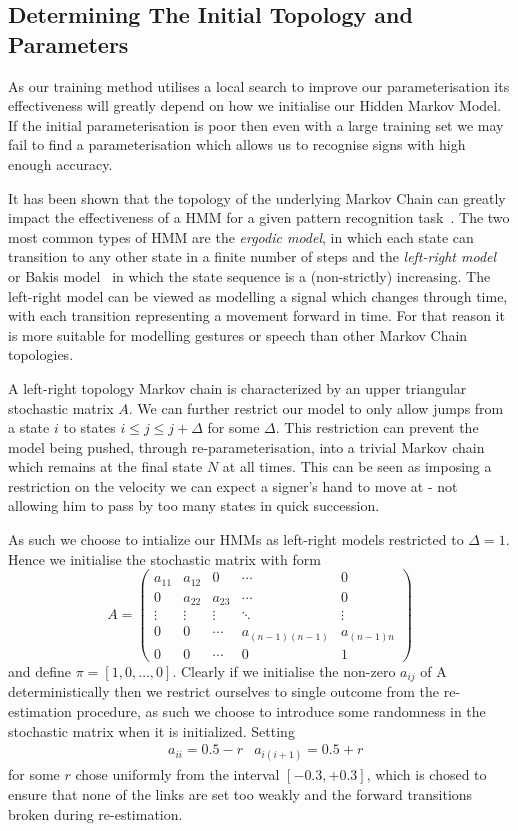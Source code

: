 \subsection{Determining The Initial Topology and Parameters}
As our training method utilises a local search to improve our parameterisation its effectiveness will greatly depend on how we initialise our Hidden Markov Model. If the initial parameterisation is poor then even with a large training set we may fail to find a parameterisation which allows us to  recognise signs with high enough accuracy.

It has been shown that the topology of the underlying Markov Chain can greatly impact the effectiveness of a HMM for a given pattern recognition task~\citep{rabiner1989tutorial, jelinek1998statistical}. The two most common types of HMM are the \emph{ergodic model}, in which each state can transition to any other state in a finite number of steps and the \emph{left-right model} or Bakis model~\citep{bakis1976continuous} in which the state sequence is a (non-strictly) increasing. The left-right model can be viewed as modelling a signal which changes through time, with each transition representing a movement forward in time. For that reason it is more suitable for modelling gestures or speech than other Markov Chain topologies. 

A left-right topology Markov chain is characterized by an upper triangular stochastic matrix $A$. We can further restrict our model to only allow jumps from a state $i$ to states $i \leq j \leq j+\Delta$ for some $\Delta$. This restriction can prevent the model being pushed, through re-parameterisation, into a trivial Markov chain which remains at the final state $N$ at all times. This can be seen as imposing a restriction on the velocity we can expect a signer's hand to move at - not allowing him to pass by too many states in quick succession.

As such we choose to intialize our HMMs as left-right models restricted to $\Delta = 1$. Hence we initialise the stochastic matrix with form
\begin{equation*}
A =
 \begin{pmatrix}
  a_{11} & a_{12} & 0 & \cdots & 0 \\
  0 & a_{22} & a_{23} &\cdots & 0 \\
  \vdots  & \vdots  & \vdots & \ddots & \vdots  \\
  0 & 0 & \cdots & a_{(n-1)(n-1)}& a_{(n-1)n} \\
  0 & 0 & \cdots & 0& 1
 \end{pmatrix}
\end{equation*}
and define $\pi = [1,0, \dots, 0]$. Clearly if we initialise the non-zero $a_{ij}$ of A deterministically then we restrict ourselves to single outcome from the re-estimation procedure, as such we choose to introduce some randomness in the stochastic matrix when it is initialized. Setting
\begin{align*}
&a_{ii} = 0.5 - r &a_{i(i+1)} = 0.5 + r
\end{align*}
 for some $r$ chose uniformly from the interval $[-0.3, +0.3]$, which is chosed to ensure that none of the links are set too weakly and the forward transitions broken during re-estimation.

